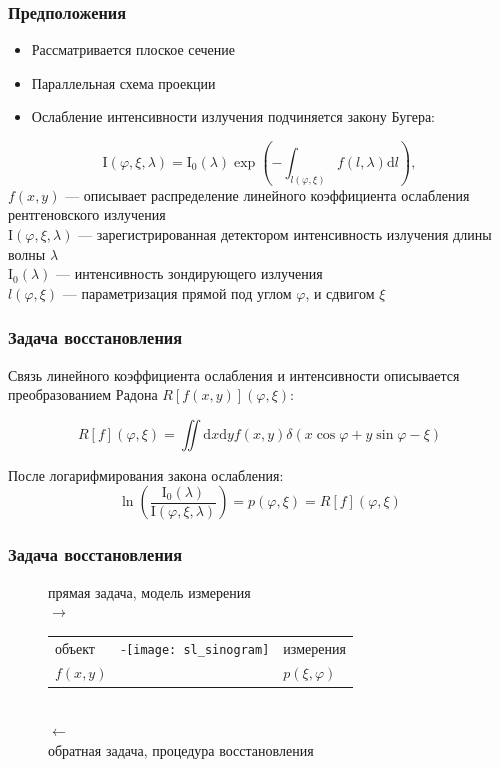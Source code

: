 \begin{frame}
\frametitle{Предположения}
\begin{itemize}
  \item Рассматривается плоское сечение
  \item Параллельная схема проекции
  \item Ослабление интенсивности излучения подчиняется закону Бугера:
\end{itemize}
  $$
  \mathrm I \left( \varphi, \xi , \lambda \right) = \mathrm I_0(\lambda) \exp\left( {-\int_{l(\varphi, \xi)} \! f(l, \lambda) \mathrm d l }\right),
  $$
  \small
  $f(x, y)$ ---  описывает распределение линейного коэффициента ослабления рентгеновского излучения \\
  $\mathrm I(\varphi, \xi, \lambda)$ --- зарегистрированная детектором интенсивность излучения длины волны $\lambda$ \\
  $\mathrm I_0(\lambda)$ --- интенсивность зондирующего излучения \\
  $l(\varphi, \xi)$ --- параметризация прямой под углом $\varphi$, и сдвигом $\xi$ \\
\end{frame}

\begin{frame}
\frametitle{Задача восстановления}
  Связь линейного коэффициента ослабления и интенсивности описывается преобразованием Радона $R[f(x,y)](\varphi, \xi)$:

  $$
  R[f](\varphi, \xi) = 
 \iint \! \mathrm d x \mathrm d y f(x,y)\delta(x\cos\varphi + y\sin\varphi - \xi)
  $$


  После логарифмирования закона ослабления:
  $$
  \ln \left (\frac{\mathrm I_0(\lambda)}{\mathrm I(\varphi, \xi, \lambda)} \right) = p(\varphi, \xi) = R[f](\varphi, \xi)
  $$

\end{frame}

\begin{frame}
\frametitle{Задача восстановления}
\begin{figure}
\centering
    прямая задача, модель измерения\\
    $\rightarrow$
    \\
    \begin{tabular}{p{} p{} p{}}
    \hspace{-1cm}
    \small{объект}
    &
    \hspace{-1cm} -\texttt{[image: sl\_sinogram]}
    &
    \hspace{-1cm} \small{измерения}
    \\
     \hspace{-1cm} \small{$f(x, y)$}
     &
    &
     \hspace{-1cm} \small{$p(\xi, \varphi)$}
    \end{tabular}
    \\
    $\leftarrow$ \\
    обратная задача, процедура восстановления
\end{figure}
\end{frame}

